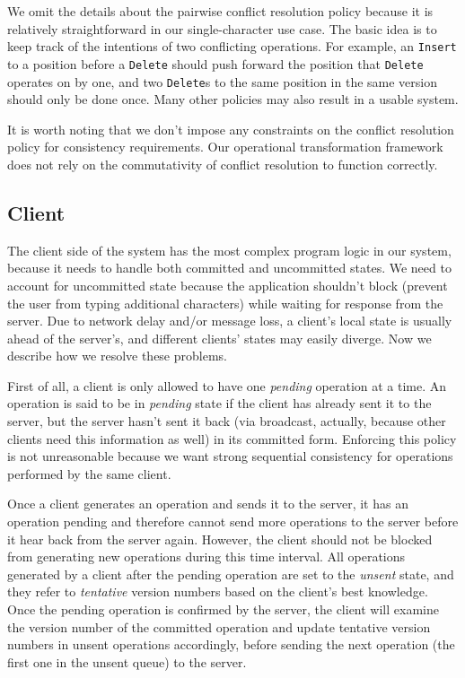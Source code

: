 We omit the details about the pairwise conflict resolution policy because it is
relatively straightforward in our single-character use case. The basic idea is
to keep track of the intentions of two conflicting operations. For example, an
{\tt Insert} to a position before a {\tt Delete} should push forward the
position that {\tt Delete} operates on by one, and two {\tt Delete}s to the same
position in the same version should only be done once. Many other policies may
also result in a usable system.

It is worth noting that we don't impose any constraints on the conflict
resolution policy for consistency requirements. Our operational transformation
framework does not rely on the commutativity of conflict resolution to function
correctly.

\subsection{Client}
\label{sec:design_client}

The client side of the system has the most complex program logic in our system,
because it needs to handle both committed and uncommitted states. We need to
account for uncommitted state because the application shouldn't block (prevent
the user from typing additional characters) while waiting for response from the
server. Due to network delay and/or message loss, a client's local state is
usually ahead of the server's, and different clients' states may easily diverge.
Now we describe how we resolve these problems.

First of all, a client is only allowed to have one {\em pending} operation at a
time. An operation is said to be in {\em pending} state if the client has
already sent it to the server, but the server hasn't sent it back (via
broadcast, actually, because other clients need this information as well) in its
committed form. Enforcing this policy is not unreasonable because we want strong
sequential consistency for operations performed by the same client.

Once a client generates an operation and sends it to the server, it has an
operation pending and therefore cannot send more operations to the server before
it hear back from the server again. However, the client should not be blocked
from generating new operations during this time interval. All operations
generated by a client after the pending operation are set to the {\em unsent}
state, and they refer to {\em tentative} version numbers based on the client's
best knowledge. Once the pending operation is confirmed by the server, the
client will examine the version number of the committed operation and update
tentative version numbers in unsent operations accordingly, before sending the
next operation (the first one in the unsent queue) to the server.

